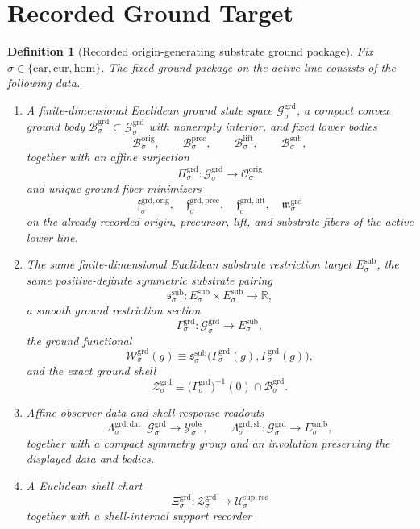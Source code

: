 \documentclass[11pt]{article}
\newcommand{\Car}{\mathrm{car}}
\newcommand{\Cur}{\mathrm{cur}}
\newcommand{\Hom}{\mathrm{hom}}
\newcommand{\DataSpace}[1]{\mathcal Y_{#1}^{\mathrm{obs}}}
\newcommand{\AmbientTarget}[1]{E_{#1}^{\mathrm{amb}}}
\newcommand{\SubBody}[1]{\mathcal B_{#1}^{\mathrm{sub}}}
\newcommand{\SubTarget}[1]{E_{#1}^{\mathrm{sub}}}
\newcommand{\SubPair}[1]{\mathfrak s_{#1}^{\mathrm{sub}}}
\newcommand{\LiftBody}[1]{\mathcal B_{#1}^{\mathrm{lift}}}
\newcommand{\PrecBody}[1]{\mathcal B_{#1}^{\mathrm{prec}}}
\newcommand{\OrigSpace}[1]{\mathcal O_{#1}^{\mathrm{orig}}}
\newcommand{\OrigBody}[1]{\mathcal B_{#1}^{\mathrm{orig}}}
\newcommand{\GroundSpace}[1]{\mathcal G_{#1}^{\mathrm{grd}}}
\newcommand{\GroundBody}[1]{\mathcal B_{#1}^{\mathrm{grd}}}
\newcommand{\GroundProj}[1]{\Pi_{#1}^{\mathrm{grd}}}
\newcommand{\GroundOrigMin}[1]{\mathfrak f_{#1}^{\mathrm{grd,orig}}}
\newcommand{\GroundPrecMin}[1]{\mathfrak f_{#1}^{\mathrm{grd,prec}}}
\newcommand{\GroundLiftMin}[1]{\mathfrak f_{#1}^{\mathrm{grd,lift}}}
\newcommand{\GroundSubMin}[1]{\mathfrak m_{#1}^{\mathrm{grd}}}
\newcommand{\GroundSection}[1]{\Gamma_{#1}^{\mathrm{grd}}}
\newcommand{\GroundFunctional}[1]{\mathscr W_{#1}^{\mathrm{grd}}}
\newcommand{\GroundData}[1]{\Lambda_{#1}^{\mathrm{grd,dat}}}
\newcommand{\GroundShellMap}[1]{\Lambda_{#1}^{\mathrm{grd,sh}}}
\newcommand{\GroundShellSet}[1]{\mathcal Z_{#1}^{\mathrm{grd}}}
\newcommand{\GroundChart}[1]{\Xi_{#1}^{\mathrm{grd}}}
\newcommand{\ResSpace}[1]{\mathcal U_{#1}^{\mathrm{sup,res}}}
\newtheorem{definition}{Definition}
\begin{document}
\section{Recorded Ground Target}

\begin{definition}[Recorded origin-generating substrate ground package]
\label{def:ground}
Fix \(\sigma\in\{\Car,\Cur,\Hom\}\). The fixed ground package on the active line consists of the following data.
\begin{enumerate}
    \item A finite-dimensional Euclidean ground state space \(\GroundSpace{\sigma}\), a compact convex ground body \(\GroundBody{\sigma}\subset\GroundSpace{\sigma}\) with nonempty interior, and fixed lower bodies
    \[
    \OrigBody{\sigma},\qquad
    \PrecBody{\sigma},\qquad
    \LiftBody{\sigma},\qquad
    \SubBody{\sigma},
    \]
    together with an affine surjection
    \[
    \GroundProj{\sigma}:\GroundSpace{\sigma}\to\OrigSpace{\sigma}
    \]
    and unique ground fiber minimizers
    \[
    \GroundOrigMin{\sigma},\quad
    \GroundPrecMin{\sigma},\quad
    \GroundLiftMin{\sigma},\quad
    \GroundSubMin{\sigma}
    \]
    on the already recorded origin, precursor, lift, and substrate fibers of the active lower line.
    \item The same finite-dimensional Euclidean substrate restriction target \(\SubTarget{\sigma}\), the same positive-definite symmetric substrate pairing
    \[
    \SubPair{\sigma}:\SubTarget{\sigma}\times\SubTarget{\sigma}\to\mathbb R,
    \]
    a smooth ground restriction section
    \[
    \GroundSection{\sigma}:\GroundSpace{\sigma}\to\SubTarget{\sigma},
    \]
    the ground functional
    \[
    \GroundFunctional{\sigma}(g)
    \equiv
    \SubPair{\sigma}\bigl(\GroundSection{\sigma}(g),\GroundSection{\sigma}(g)\bigr),
    \]
    and the exact ground shell
    \[
    \GroundShellSet{\sigma}
    \equiv
    \bigl(\GroundSection{\sigma}\bigr)^{-1}(0)\cap\GroundBody{\sigma}.
    \]
    \item Affine observer-data and shell-response readouts
    \[
    \GroundData{\sigma}:\GroundSpace{\sigma}\to\DataSpace{\sigma},
    \qquad
    \GroundShellMap{\sigma}:\GroundSpace{\sigma}\to\AmbientTarget{\sigma},
    \]
    together with a compact symmetry group and an involution preserving the displayed data and bodies.
    \item A Euclidean shell chart
    \[
    \GroundChart{\sigma}:\GroundShellSet{\sigma}\to\ResSpace{\sigma}
    \]
    together with a shell-internal support recorder

\end{enumerate}
\end{definition}
\end{document}

